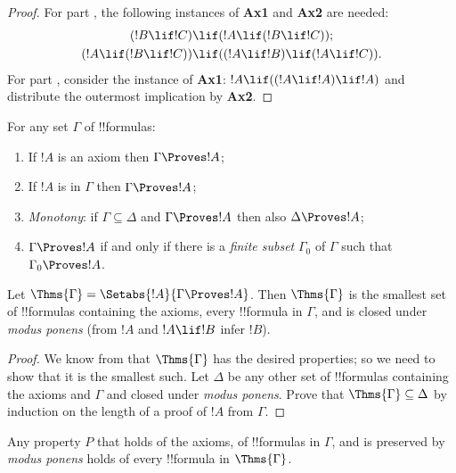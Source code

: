 \documentclass[../../../include/open-logic-section]{subfiles}
\begin{document}
\begin{proof}
For part , the following instances
of \textbf{Ax1} and \textbf{Ax2} are needed:
\begin{align*}
  (!B \lif !C) & \lif (!A \lif (!B \lif !C)); \\
  (!A \lif (!B \lif !C)) & \lif ((!A \lif !B) \lif
    (!A \lif !C)).
\end{align*}
For part , consider the instance of
\textbf{Ax1}: $!A \lif ((!A \lif !A) \lif
!A)$ and distribute the outermost implication by \textbf{Ax2}.
\end{proof}

\begin{prop}
For any set $\Gamma$ of !!{formula}s:
\begin{enumerate}
\item If $!A$ is an axiom then $\Gamma \Proves !A$;
\item If $!A$ is in $\Gamma$ then $\Gamma \Proves
  !A$;
\item \emph{Monotony}: if $\Gamma \subseteq \Delta$ and $\Gamma
  \Proves !A$ then also $\Delta \Proves
  !A$;
\item $\Gamma \Proves !A$ if and only if there is a \emph{finite
  subset} $\Gamma_0$ of $\Gamma$ such that $\Gamma_0 \Proves !A$.
\end{enumerate}
\end{prop}

\begin{thm}
Let $\Thms{\Gamma} = \Setabs{!A}{\Gamma \Proves !A}$. Then
$\Thms{\Gamma}$ is the smallest set of !!{formula}s containing the
axioms, every !!{formula} in $\Gamma$, and is closed under \emph{modus
  ponens} (from $!A$ and $!A \lif !B$ infer $!B$).
\end{thm} 

\begin{proof}
We know from  that $\Thms{\Gamma}$ has the desired
properties; so we need to show that it is the smallest such. Let
$\Delta$ be any other set of !!{formula}s containing the axioms and
$\Gamma$ and closed under \emph{modus ponens}. Prove that
$\Thms{\Gamma} \subseteq \Delta$ by induction on the length of a proof
of $!A$ from $\Gamma$.
\end{proof}

\begin{cor}
Any property $P$ that holds of the axioms, of !!{formula}s in
$\Gamma$, and is preserved by \emph{modus ponens} holds of every
!!{formula} in $\Thms{\Gamma}$.
\end{cor}
\end{document}
